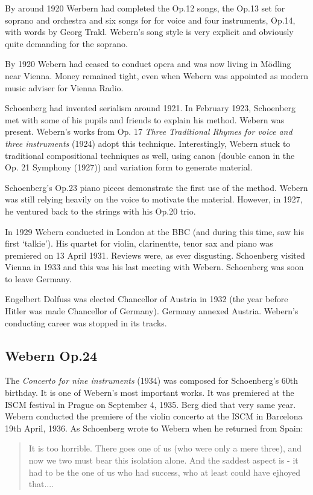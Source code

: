 By around 1920 Werbern had completed the Op.12 songs, the Op.13 set for soprano and orchestra and six songs for for voice and four instruments, Op.14, with words by Georg Trakl. Webern's song style is very explicit and obviously quite demanding for the soprano. 

By 1920 Webern had ceased to conduct opera and was now living in M\"odling near Vienna. Money remained tight, even when Webern was appointed as modern music adviser for Vienna Radio.  

Schoenberg had invented serialism around 1921. In February 1923, Schoenberg met with some of his pupils and friends to explain his method. Webern was present. Webern's works from Op. 17 \textit{Three Traditional Rhymes for voice and three instruments} (1924) adopt this technique. Interestingly, Webern stuck to traditional compositional techniques as well, using canon (double canon in the Op. 21 Symphony (1927)) and variation form to generate material. 

Schoenberg's Op.23 piano pieces demonstrate the first use of the method. Webern was still relying heavily on the voice to motivate the material. However, in 1927, he ventured back to the strings with his Op.20 trio. 
  
In 1929 Webern conducted in London at the BBC (and during this time, saw his first `talkie'). His quartet for violin, clarinentte, tenor sax and piano was premiered on 13 April 1931. Reviews were, as ever disgusting. Schoenberg visited Vienna in 1933 and this was his last meeting with Webern. Schoenberg was soon to leave Germany. 

Engelbert Dolfuss was elected Chancellor of Austria in 1932 (the year before Hitler was made Chancellor of Germany). Germany annexed Austria. Webern's conducting career was stopped in its tracks. 

\subsection{Webern Op.24}
 
The \textit{Concerto for nine instruments} (1934) was composed for Schoenberg's 60th birthday. It is one of Webern's most important works. It was premiered at the ISCM festival in Prague on September 4, 1935. Berg died that very same year. Webern conducted the premiere of the violin concerto at the ISCM in Barcelona 19th April, 1936. As Schoenberg wrote to Webern when he returned from Spain:

\begin{quote}
It is too horrible. There goes one of us (who were only a mere three), and now we two must bear this isolation alone. And the saddest aspect is - it had to be the one of us who had success, who at least could have ejhoyed that....
\end{quote}


